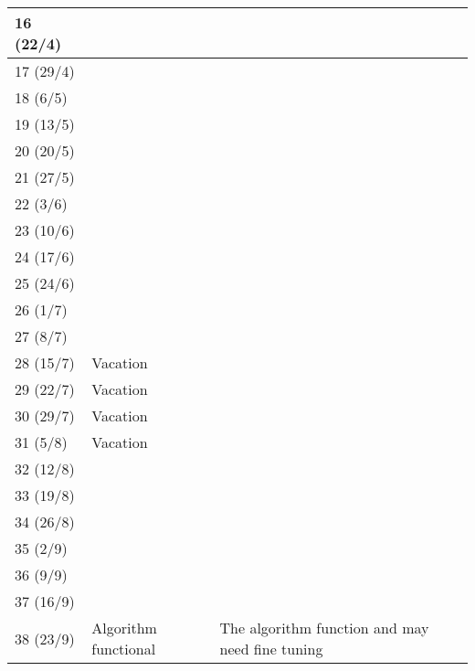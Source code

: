 \begin{table}[H]
\begin{tabular}{|p{}|p{}|p{}|}
	16 (22/4)            &                                       &  \\ \hline
	17 (29/4)            &                                       &  \\ \hline
	18 (6/5)             &                                       &  \\ \hline
	19 (13/5)            &                                       &  \\ \hline
	20 (20/5)            &                                       &  \\ \hline
	21 (27/5)            &                                       &  \\ \hline
	22 (3/6)             &                                       &  \\ \hline
	23 (10/6)            &                                       &  \\ \hline
	24 (17/6)            &                                       &  \\ \hline
	25 (24/6)            &                                       &  \\ \hline
	26 (1/7)             &                                       &  \\ \hline
	27 (8/7)             &                                       &  \\ \hline
	28 (15/7)            & Vacation                              &  \\ \hline
	29 (22/7)            & Vacation                              &  \\ \hline
	30 (29/7)            & Vacation                              &  \\ \hline
	31 (5/8)             & Vacation                              &  \\ \hline
	32 (12/8)            &                                       &  \\ \hline
	33 (19/8)            &                                       &  \\ \hline
	34 (26/8)            &                                       &  \\ \hline
	35 (2/9)             &                                       &  \\ \hline
	36 (9/9)             &                                       &  \\ \hline
	37 (16/9)            &                                       &  \\ \hline
	38 (23/9)            & Algorithm functional                  & The algorithm function and may need fine tuning                                                                                       \\ \hline

\end{tabular}
\end{table}
